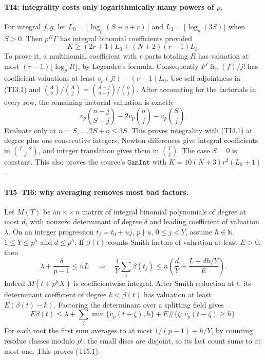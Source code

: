 \paragraph{TI4: integrality costs only logarithmically many powers of $p$.}
For integral $f,g$, let $L_0=\lfloor\log_p(S+o+r)\rfloor$ and
$L_3=\lfloor\log_p(3S)\rfloor$ when $S>0$. Then $p^K\Gamma$ has
integral binomial coefficients provided
\[
 K\geq(2r+1)L_0+(N+2)(r-1)L_3.
 \tag{TI4.1}
\]
To prove it, a multinomial coefficient with $r$ parts totaling $R$ has
valuation at most $(r-1)\lfloor\log_pR\rfloor$, by Legendre's formula.
Consequently $F^j\operatorname{fr}_n(f)/j!$ has coefficient valuations
at least $v_p(j!)-(r-1)L_0$.
Use self-adjointness in (TI3.1) and
$\binom Ao/\binom Aj=\binom{A-j}{o-j}/\binom oj$.
After accounting for the factorials in every row, the remaining factorial
valuation is exactly
\[
 v_p\binom{n-j}{S-j}-2v_p\binom oj-v_p\binom Sj.
\]
Evaluate only at $n=S,\ldots,2S+o\leq3S$.
This proves integrality with (TI4.1) at degree plus one consecutive integers;
Newton differences give integral coefficients in $\binom{T-S}j$, and
integer translation gives them in $\binom Tj$.
The case $S=0$ is constant.  This also proves the source's
$\texttt{GamInt}$ with $K=10(N+3)r^2(L_0+1)$.

\paragraph{TI5--TI6: why averaging removes most bad factors.}
Let $M(T)$ be an $n\times n$ matrix of integral binomial polynomials of
degree at most $d$, with nonzero determinant of degree $\delta$ and
leading coefficient of valuation $\lambda$.
On an integer progression $t_j=t_0+uj$, $p\nmid u$, $0\leq j<Y$, assume
$h\in\mathbb N$, $1\leq Y\leq p^h$ and $d\leq p^h$.
If $\beta(t)$ counts Smith factors of valuation at
least $E>0$, then
\[
 \lambda+\frac\delta{p-1}\leq nL
 \quad\Longrightarrow\quad
 \frac1Y\sum_j\beta(t_j)
 \leq n\left(\frac dY+\frac{L+dh/Y}{E}\right).
 \tag{TI5.1}
\]
Indeed $M(t+p^hX)$ is coefficientwise integral.  After Smith reduction at
$t$, its determinant coefficient of degree $k<\beta(t)$ has valuation
at least $E(\beta(t)-k)$.
Factoring the determinant over a splitting field gives
\[
 E\beta(t)\leq\lambda+\sum_\zeta\min\{v_p(t-\zeta),h\}
       +E\#\{\zeta:v_p(t-\zeta)\geq h\}.
\]
For each root the first sum averages to at most $1/(p-1)+h/Y$,
by counting residue classes modulo $p^i$; the small discs are disjoint,
so its last count sums to at most one. This proves (TI5.1).

